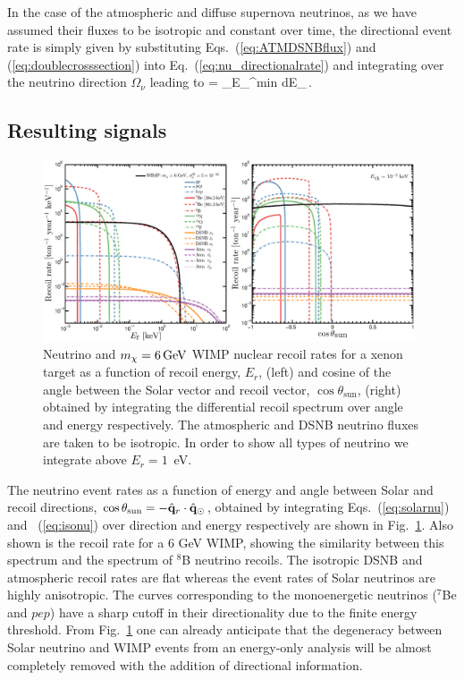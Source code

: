In the case of the atmospheric and diffuse supernova neutrinos, as we have assumed their fluxes to be isotropic and constant over time, the directional event rate is simply given by substituting Eqs.~(\ref{eq:ATMDSNBflux}) and (\ref{eq:doublecrosssection}) into Eq.~(\ref{eq:nu_directionalrate}) and integrating over the neutrino direction $\Omega_\nu$ leading to
\be
{} =  \int_{E_{\nu}^\textrm{min}}   \textrm{d}E_\nu \,. 
\label{eq:isonu}
\ee


\subsection{Resulting signals}
\label{sec:nufloor_signals}
 \begin{figure}
\begin{center}
\includegraphics[trim = 0mm 0 0mm 0mm, clip, width=0.98\textwidth,angle=0]{Figures/NeutrinoAll_1D_recoilrates.eps}
\caption[Neutrino and $m_{\chi} = 6 \, {\rm GeV}$ WIMP nuclear recoil rates]{Neutrino and $m_{\chi} = 6 \, {\rm GeV}$ WIMP nuclear recoil rates for a xenon target as a function of recoil energy, $E_r$, (left) and cosine of the angle between the Solar vector and recoil vector, $\cos \theta_\textrm{sun}$, (right)  obtained by integrating the differential recoil spectrum over angle and energy respectively. The atmospheric and DSNB neutrino fluxes are taken to be isotropic. In order to show all types of neutrino we integrate above $E_r = 1$~eV.} 
\label{fig:neutrinorates}
\end{center}
\end{figure} 
The neutrino event rates as a function of energy and angle between Solar and recoil directions, $\cos{\theta_\textrm{sun}} = -\hat{\bf{q}}_r\cdot\hat{\bf{q}}_\odot$, obtained by integrating Eqs.~(\ref{eq:solarnu}) and ~(\ref{eq:isonu}) over direction and energy respectively are shown in Fig.~\ref{fig:neutrinorates}. Also shown is the recoil rate for a 6 GeV WIMP, showing the similarity between this spectrum and the spectrum of $^8$B neutrino recoils. The isotropic DSNB and atmospheric recoil rates are flat whereas the event rates of Solar neutrinos are highly anisotropic. The curves corresponding to the monoenergetic neutrinos ($^7$Be and $pep$) have a sharp cutoff in their directionality due to the finite energy threshold. From Fig.~\ref{fig:neutrinorates} one can already anticipate that the degeneracy between Solar neutrino and WIMP events from an energy-only analysis will be almost completely removed with the addition of directional information.


